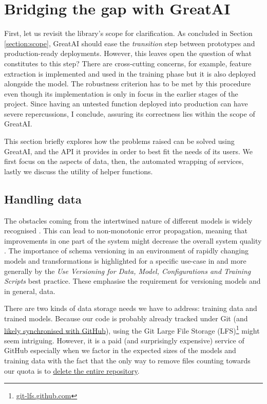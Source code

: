 \section{Bridging the gap with GreatAI}

First, let us revisit the library's scope for clarification. As concluded in Section \ref{section:scope}, GreatAI should ease the \textit{transition} step between prototypes and production-ready deployments. However, this leaves open the question of what constitutes to this step? There are cross-cutting concerns, for example, feature extraction is implemented and used in the training phase but it is also deployed alongside the model. The robustness criterion has to be met by this procedure even though its implementation is only in focus in the earlier stages of the project. Since having an untested function deployed into production can have severe repercussions, I conclude, assuring its correctness lies within the scope of GreatAI.

This section briefly explores how the problems raised can be solved using GreatAI, and the API it provides in order to best fit the needs of its users. We first focus on the aspects of data, then, the automated wrapping of services, lastly we discuss the utility of helper functions.

\subsection{Handling data} \label{subsection:large-file}

The obstacles coming from the intertwined nature of different models is widely recognised \cite{haakman2021ai,amershi2019software,sculley2015hidden}. This can lead to non-monotonic error propagation, meaning that improvements in one part of the system might decrease the overall system quality \cite{amershi2019software}. The importance of schema versioning in an environment of rapidly changing models and transformations is highlighted for a specific use-case in \cite{van2017versioning} and more generally by the \textit{Use Versioning for Data, Model, Configurations and Training Scripts} best practice. These emphasise the requirement for versioning models and in general, data.

There are two kinds of data storage needs we have to address: training data and trained models. Because our code is probably already tracked under Git (and \href{https://octoverse.github.com/#lets-look-back-at-the-code-and-communities-built-on-git-hub-this-year}{likely synchronised with GitHub}), using the Git Large File Storage (LFS)\footnote{\href{https://git-lfs.github.com/}{git-lfs.github.com}} might seem intriguing. However, it is a paid (and surprisingly expensive) service of GitHub especially when we factor in the expected sizes of the models and training data with the fact that the only way to remove files counting towards our quota is to \href{https://docs.github.com/en/repositories/working-with-files/managing-large-files/removing-files-from-git-large-file-storage#git-lfs-objects-in-your-repository}{delete the entire repository}.

